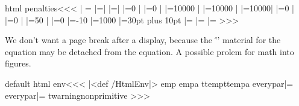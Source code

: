 \<html penalties\><<<
\frenchspacing        |%
\let\nonfrenchspacing|=\relax
\spaceskip|=\z@        |%
\xspaceskip|=\z@       |%
\linepenalty|=0        |%
\adjdemerits|=0        |%
\pretolerance|=10000   |%
\hyphenpenalty|=10000  |%
\exhyphenpenalty|=10000|%
\clubpenalty|=0        |%
\widowpenalty|=0       |%
\interlinepenalty|=50  |%
\displaywidowpenalty|=0
\predisplaypenalty|=-10
\postdisplaypenalty|=1000
\abovedisplayskip|=30pt plus 10pt
\belowdisplayskip|=\abovedisplayskip
\abovedisplayshortskip|=\abovedisplayskip
\belowdisplayshortskip|=\abovedisplayskip
>>>

We don't want a page break after a display, because the
\''\aftergroup' material for the equation may be detached from the
equation. A possible prolem for math into figures.


\<default html env\><<<
|<def /HtmlEnv|>
\edef\:temp{\meaning\everypar}
\edef\:tempa{\string\everypar}
\ifx \:temp\:tempa   
   \let\ht:everypar|=\everypar
\else
   \let\ht:everypar|=\everypar
   \:warning{nonprimitive \string\everypar}
\fi
\edef\NoHtmlEnv{%
   \sfcode `\noexpand\noexpand\noexpand\.3000  |%
   \sfcode `\noexpand\noexpand\noexpand\?3000
   \sfcode `\noexpand\noexpand\noexpand\!3000
   \sfcode `\noexpand\noexpand\noexpand\:2000
   \sfcode `\noexpand\noexpand\noexpand\;1500
   \sfcode `\noexpand\noexpand\noexpand\,1250 
   \rightskip|=\the\rightskip  
   \spaceskip|=\the\spaceskip
   \xspaceskip|=\the\xspaceskip
   \linepenalty|=\the\linepenalty
   \adjdemerits|=\the\adjdemerits
   \pretolerance|=\the\pretolerance
   \hyphenpenalty|=\the\hyphenpenalty
   \exhyphenpenalty|=\the\exhyphenpenalty
   \clubpenalty|=\the\clubpenalty
   \widowpenalty|=\the\widowpenalty
   \interlinepenalty|=\the\interlinepenalty
   \displaywidowpenalty|=\the\displaywidowpenalty
   \predisplaypenalty|=\the\predisplaypenalty
   \postdisplaypenalty|=\the\postdisplaypenalty
   \abovedisplayskip|=\the\abovedisplayskip
   \belowdisplayskip|=\the\belowdisplayskip
   \abovedisplayshortskip|=\the\abovedisplayshortskip
   \belowdisplayshortskip|=\the\belowdisplayshortskip
   \noexpand\ht:everypar{\noexpand\the\noexpand\ht:everypar}}
>>>


